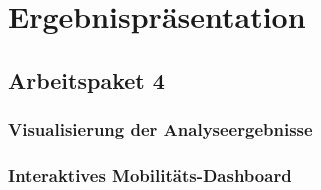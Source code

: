 \newpage
\section{Ergebnispräsentation} \label{website}

\subsection{Arbeitspaket 4}
\subsubsection{Visualisierung der Analyseergebnisse}

\subsubsection{Interaktives Mobilitäts-Dashboard}
